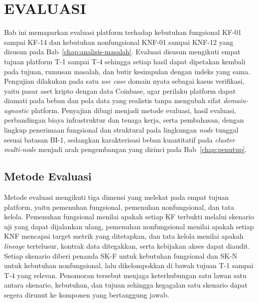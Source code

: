 \cleardoublepage
\chapter{EVALUASI}
\label{chap:evaluasi}

Bab ini memaparkan evaluasi platform terhadap kebutuhan fungsional KF-01 sampai KF-14 dan kebutuhan nonfungsional KNF-01 sampai KNF-12 yang disusun pada Bab~\ref{chap:analisis-masalah}. Evaluasi disusun mengikuti empat tujuan platform T-1 sampai T-4 sehingga setiap hasil dapat dipetakan kembali pada tujuan, rumusan masalah, dan butir kesimpulan dengan indeks yang sama. Pengujian dilakukan pada satu \textit{use case} domain nyata sebagai kasus verifikasi, yaitu pasar aset kripto dengan data Coinbase, agar perilaku platform dapat diamati pada beban dan pola data yang realistis tanpa mengubah sifat \textit{domain-agnostic} platform. Penyajian dibagi menjadi metode evaluasi, hasil evaluasi, perbandingan biaya infrastruktur dan tenaga kerja, serta pembahasan, dengan lingkup penerimaan fungsional dan struktural pada lingkungan \textit{node} tunggal sesuai batasan BI-1, sedangkan karakterisasi beban kuantitatif pada \textit{cluster} \textit{multi-node} menjadi arah pengembangan yang dirinci pada Bab~\ref{chap:penutup}.

\section{Metode Evaluasi}
\label{sec:metode-evaluasi}

Metode evaluasi mengikuti tiga dimensi yang melekat pada empat tujuan platform, yaitu pemenuhan fungsional, pemenuhan nonfungsional, dan tata kelola. Pemenuhan fungsional menilai apakah setiap KF terbukti melalui skenario uji yang dapat dijalankan ulang, pemenuhan nonfungsional menilai apakah setiap KNF mencapai target metrik yang ditetapkan, dan tata kelola menilai apakah \textit{lineage} tertelusur, kontrak data ditegakkan, serta kebijakan akses dapat diaudit. Setiap skenario diberi penanda SK-F untuk kebutuhan fungsional dan SK-N untuk kebutuhan nonfungsional, lalu dikelompokkan di bawah tujuan T-1 sampai T-4 yang relevan. Penomoran tersebut menjaga keterhubungan satu lawan satu antara skenario, kebutuhan, dan tujuan sehingga kegagalan satu skenario dapat segera dirunut ke komponen yang bertanggung jawab.


